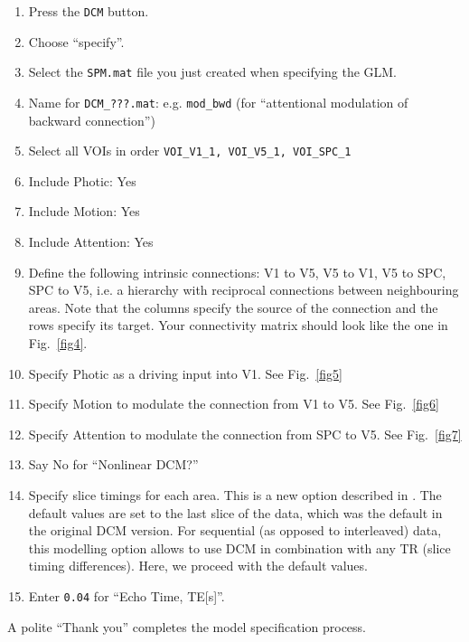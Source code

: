 \begin{enumerate}
\item{Press the \texttt{DCM} button.}
\item{Choose ``specify''.}
\item{Select the \texttt{SPM.mat} file you just created when specifying the GLM.}
\item{Name for \verb!DCM_???.mat!:  e.g. \verb!mod_bwd! (for ``attentional modulation of backward connection'')}
\item{Select all VOIs in order \verb!VOI_V1_1, VOI_V5_1, VOI_SPC_1!}
\item{Include Photic: Yes}
\item{Include Motion: Yes}
\item{Include Attention: Yes}
\item{Define the following intrinsic connections: V1 to V5, V5 to V1, V5 to SPC, SPC to V5, i.e. a hierarchy with reciprocal connections between neighbouring areas. Note that the columns specify the source of the connection and the rows specify its target. Your connectivity matrix should look like the one in Fig.~\ref{fig4}.}
\item{Specify Photic as a driving input into V1.  See Fig.~\ref{fig5}}
\item{Specify Motion to modulate the connection from V1 to V5.  See Fig.~\ref{fig6}}
\item{Specify Attention to modulate the connection from SPC to V5.  See Fig.~\ref{fig7}}
\item{Say No for ``Nonlinear DCM?''}
\item{Specify slice timings for each area. This is a new option described in \cite{sjk_dcm_slicetiming}. The default values are set to the last slice of the data, which was the default in the original DCM version. For sequential (as opposed to interleaved) data, this modelling option allows to use DCM in combination with any TR (slice timing differences). Here, we proceed with the default values.}
\item{Enter \texttt{0.04} for ``Echo Time, TE[s]''.}
\end{enumerate}
A polite ``Thank you'' completes the model specification process.

